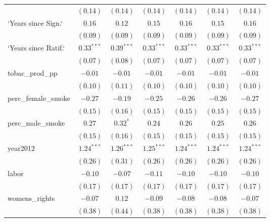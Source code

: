 \begin{table}[!h]
\begin{center}
\begin{tabular}{l c c c c c c }
                        & $(0.14)$     & $(0.14)$     & $(0.14)$     & $(0.14)$     & $(0.14)$     & $(0.14)$     \\
`Years since Sign.`     & $0.16$       & $0.12$       & $0.15$       & $0.16$       & $0.15$       & $0.16$       \\
                        & $(0.09)$     & $(0.09)$     & $(0.09)$     & $(0.09)$     & $(0.09)$     & $(0.09)$     \\
`Years since Ratif.`    & $0.33^{***}$ & $0.39^{***}$ & $0.33^{***}$ & $0.33^{***}$ & $0.33^{***}$ & $0.33^{***}$ \\
                        & $(0.07)$     & $(0.08)$     & $(0.07)$     & $(0.07)$     & $(0.07)$     & $(0.07)$     \\
tobac\_prod\_pp         & $-0.01$      & $-0.01$      & $-0.01$      & $-0.01$      & $-0.01$      & $-0.01$      \\
                        & $(0.10)$     & $(0.11)$     & $(0.10)$     & $(0.10)$     & $(0.10)$     & $(0.10)$     \\
perc\_female\_smoke     & $-0.27$      & $-0.19$      & $-0.25$      & $-0.26$      & $-0.26$      & $-0.27$      \\
                        & $(0.15)$     & $(0.16)$     & $(0.15)$     & $(0.15)$     & $(0.15)$     & $(0.15)$     \\
perc\_male\_smoke       & $0.27$       & $0.32^{*}$   & $0.24$       & $0.26$       & $0.25$       & $0.26$       \\
                        & $(0.15)$     & $(0.16)$     & $(0.15)$     & $(0.15)$     & $(0.15)$     & $(0.15)$     \\
year2012                & $1.24^{***}$ & $1.26^{***}$ & $1.25^{***}$ & $1.24^{***}$ & $1.24^{***}$ & $1.24^{***}$ \\
                        & $(0.26)$     & $(0.31)$     & $(0.26)$     & $(0.26)$     & $(0.26)$     & $(0.26)$     \\
labor                   & $-0.10$      & $-0.07$      & $-0.11$      & $-0.10$      & $-0.10$      & $-0.10$      \\
                        & $(0.17)$     & $(0.17)$     & $(0.17)$     & $(0.17)$     & $(0.17)$     & $(0.17)$     \\
womens\_rights          & $-0.07$      & $0.12$       & $-0.09$      & $-0.08$      & $-0.08$      & $-0.07$      \\
                        & $(0.38)$     & $(0.44)$     & $(0.38)$     & $(0.38)$     & $(0.38)$     & $(0.38)$     \\

\end{tabular}
\end{center}
\end{table}
